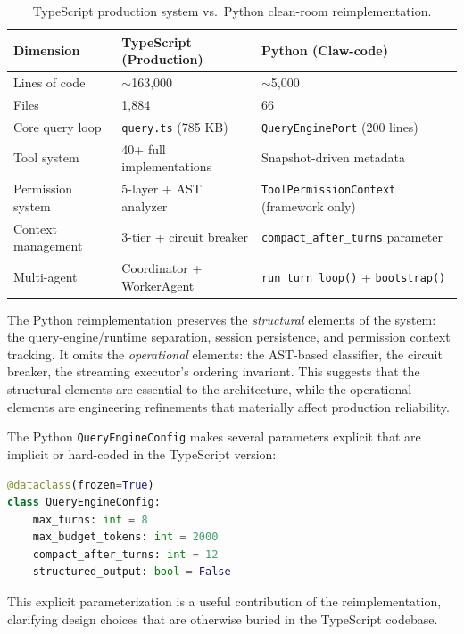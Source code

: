 \documentclass{article}
\newcommand{\file}[1]{\texttt{\small #1}}
\newcommand{\code}[1]{\texttt{#1}}
\begin{document}
\begin{table}[t]
\centering
\caption{TypeScript production system vs.\ Python clean-room reimplementation.}
\label{tab:comparison}
\small
\begin{tabular}{lll}
\toprule
\textbf{Dimension} & \textbf{TypeScript (Production)} & \textbf{Python (Claw-code)} \\
\midrule
Lines of code         & $\sim$163,000 & $\sim$5,000 \\
Files                 & 1,884         & 66 \\
Core query loop       & \file{query.ts} (785 KB) & \file{QueryEnginePort} (200 lines) \\
Tool system           & 40+ full implementations & Snapshot-driven metadata \\
Permission system     & 5-layer + AST analyzer & \code{ToolPermissionContext} (framework only) \\
Context management    & 3-tier + circuit breaker & \code{compact\_after\_turns} parameter \\
Multi-agent           & Coordinator + WorkerAgent & \code{run\_turn\_loop()} + \code{bootstrap()} \\
\bottomrule
\end{tabular}
\end{table}

The Python reimplementation preserves the \emph{structural} elements of the system: the query-engine/runtime separation, session persistence, and permission context tracking. It omits the \emph{operational} elements: the AST-based classifier, the circuit breaker, the streaming executor's ordering invariant. This suggests that the structural elements are essential to the architecture, while the operational elements are engineering refinements that materially affect production reliability.

The Python \code{QueryEngineConfig} makes several parameters explicit that are implicit or hard-coded in the TypeScript version:
\begin{lstlisting}[language=Python, caption={Python reimplementation makes configuration explicit.}]
@dataclass(frozen=True)
class QueryEngineConfig:
    max_turns: int = 8
    max_budget_tokens: int = 2000
    compact_after_turns: int = 12
    structured_output: bool = False
\end{lstlisting}

This explicit parameterization is a useful contribution of the reimplementation, clarifying design choices that are otherwise buried in the TypeScript codebase.
\end{document}
